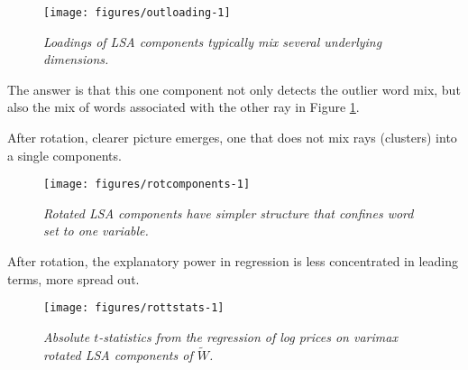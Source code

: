 \documentclass[12pt]{article}\usepackage[]{graphicx}\usepackage[]{color}
\newenvironment{knitrout}{}{} %
\begin{document}
\begin{figure}
\begin{knitrout}
\color{fgcolor}

{\centering \texttt{[image: figures/outloading-1]} 

}



\end{knitrout}
 \caption{ \label{fig:outloading} {\sl Loadings of LSA components
 typically mix several underlying dimensions.}  }
\end{figure}


 The answer is that this one component not only detects the outlier
 word mix, but also the mix of words associated with the other ray in
 Figure \ref{fig:outloading}.

 After rotation, clearer picture
 emerges, one that does not mix rays (clusters) into a single
 components.



\begin{figure}
\begin{knitrout}
\color{fgcolor}

{\centering \texttt{[image: figures/rotcomponents-1]} 

}



\end{knitrout}
\caption{  \label{fig:rotcomponents}
 {\sl Rotated LSA components have simpler structure that confines
 word set to one variable.}  }
\end{figure}


 After rotation, the explanatory power in regression is less
 concentrated in leading terms, more spread out.


\begin{figure}
\begin{knitrout}
\color{fgcolor}

{\centering \texttt{[image: figures/rottstats-1]} 

}



\end{knitrout}
\caption{  \label{fig:rottstats}
  {\sl Absolute $t$-statistics from the regression of log prices on varimax
   rotated LSA components of $\widetilde{W}$.}  }
\end{figure}
\end{document}
